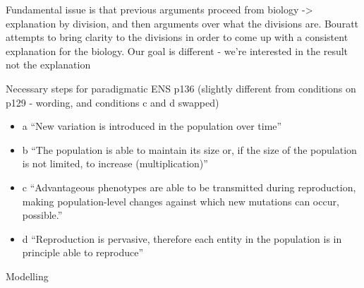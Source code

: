 	
	Fundamental issue is that previous arguments proceed from biology
	-\textgreater{} explanation by division, and then arguments over what
	the divisions are. Bouratt attempts to bring clarity to the divisions
	in order to come up with a consistent explanation for the biology. Our
	goal is different - we're interested in the result not the explanation

	Necessary steps for paradigmatic ENS p136 (slightly different from
	conditions on p129 - wording, and conditions c and d swapped)
	
	
\begin{itemize}
	\item
	
	a ``New variation is introduced in the population over time''
	
	\item
	
	b ``The population is able to maintain its size or, if the size of
	the population is not limited, to increase (multiplication)''
	
	\item
	
	c ``Advantageous phenotypes are able to be transmitted during
	reproduction, making population-level changes against which new
	mutations can occur, possible.''
	
	\item
	
	d ``Reproduction is pervasive, therefore each entity in the
	population is in principle able to reproduce''
	
\end{itemize}

	
Modelling
	
